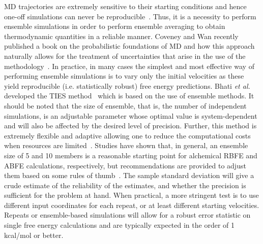 \documentclass[9pt,bestpractices]{livecoms}
\begin{document}
MD trajectories are extremely sensitive to their starting conditions and hence one-off simulations can never be reproducible~\cite{coveney2016}. Thus, it is a necessity to perform ensemble simulations in order to perform ensemble averaging to obtain thermodynamic quantities in a reliable manner. Coveney and Wan recently published a book on the probabilistic foundations of MD and how this approach naturally allows for the treatment of uncertainties that arise in the use of the methodology~\cite{MDbook2025}. In practice, in many cases the simplest and most effective way of performing ensemble simulations is to vary only the initial velocities as these yield reproducible (i.e. statistically robust) free energy predictions. Bhati \textit{et al.} developed the TIES method~\cite{bhati2017, bhati2022, bhati2025} which is based on the use of ensemble methods. It should be noted that the size of ensemble, that is, the number of independent simulations, is an adjustable parameter whose optimal value is system-dependent and will also be affected by the desired level of precision. Further, this method is extremely flexible and adaptive allowing one to reduce the computational costs when resources are limited~\cite{wan2023}. Studies have shown that, in general, an ensemble size of 5 and 10 members is a reasonable starting point for alchemical RBFE and ABFE calculations, respectively, but recommendations are provided to adjust them based on some rules of thumb~\cite{bhati2022, bhati2025}. 
The sample standard deviation will give a crude estimate of the reliability of the estimates, and whether the precision is sufficient for the problem at hand. When practical, a more stringent test is to use different input coordinates for each repeat, or at least different starting velocities. Repeats or ensemble-based simulations will allow for a robust error statistic on single free energy calculations and are typically expected in the order of 1 kcal/mol or better. 

\end{document}
